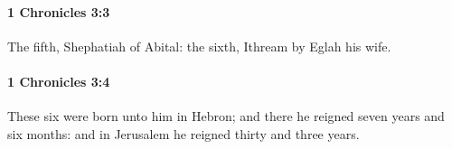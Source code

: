 		\paragraph{1 Chronicles 3:3} %
			\label{1CHRONICLES-3-3}

			The fifth, Shephatiah of Abital: the sixth, Ithream by Eglah his wife.


		\paragraph{1 Chronicles 3:4} %
			\label{1CHRONICLES-3-4}

			These six were born unto him in Hebron; and there he reigned seven years and six months: and in Jerusalem he reigned thirty and three years.


